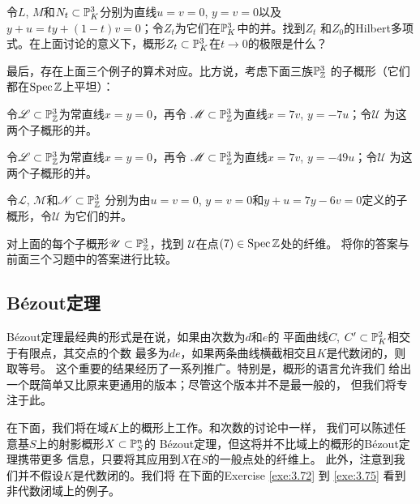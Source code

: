 
\begin{exe}\label{exe:3.69}
令$L$, $M$和$N_t\subset \P_K^3$分别为直线$u=v=0$, $y=v=0$以及
$y+u=ty+(1-t)v=0$；令$Z_t$为它们在$\P_K^3$中的并。找到$Z_t$
和$Z_0$的Hilbert多项式。在上面讨论的意义下，概形$Z_t\subset 
\P_K^3$在$t\to 0$的极限是什么？
\end{exe}


最后，存在上面三个例子的算术对应。比方说，考虑下面三族$\P_\zz^3$
的子概形（它们都在$\spec \zz$上平坦）：
\begin{compactenum}[(a)]
\item 令$\mathscr L\subset \P_\zz^3$为常直线$x=y=0$，再令
$\mathscr M\subset \P_\zz^3$为直线$x=7v$, $y=-7u$；令$\mathscr U$
为这两个子概形的并。
\item 令$\mathscr L\subset \P_\zz^3$为常直线$x=y=0$，再令
$\mathscr M\subset \P_\zz^3$为直线$x=7v$, $y=-49u$；令$\mathscr U$
为这两个子概形的并。
\item 令$\mathscr L$, $\mathscr M$和$\mathscr N\subset \P_\zz^3$
分别为由$u=v=0$, $y=v=0$和$y+u=7y-6v=0$定义的子概形，令$\mathscr U$
为它们的并。
\end{compactenum}

\begin{exe}\label{exe:3.70}
对上面的每个子概形$\mathscr U\subset \P_\zz^3$，找到
$\mathscr U$在点$(7)\in\spec \zz$处的纤维。
将你的答案与前面三个习题中的答案进行比较。
\end{exe}

\subsection{B\texorpdfstring{\'{e}}{é}zout定理}
\label{s:3.3.5}

B\'ezout定理最经典的形式是在说，如果由次数为$d$和$e$的
平面曲线$C$, $C'\subset \P_K^2$相交于有限点，其交点的个数
最多为$de$，如果两条曲线横截相交且$K$是代数闭的，则取等号。
这个重要的结果经历了一系列推广。特别是，概形的语言允许我们
给出一个既简单又比原来更通用的版本；尽管这个版本并不是最一般的，
但我们将专注于此。

在下面，我们将在域$K$上的概形上工作。和次数的讨论中一样，
我们可以陈述任意基$S$上的射影概形$X\subset \P_S^n$的
B\'ezout定理，但这将并不比域上的概形的B\'ezout定理携带更多
信息，只要将其应用到$X$在$S$的一般点处的纤维上。
此外，注意到我们并不假设$K$是代数闭的。我们将
在下面的Exercise \ref{exe:3.72} 到 \ref{exe:3.75} 
看到非代数闭域上的例子。

